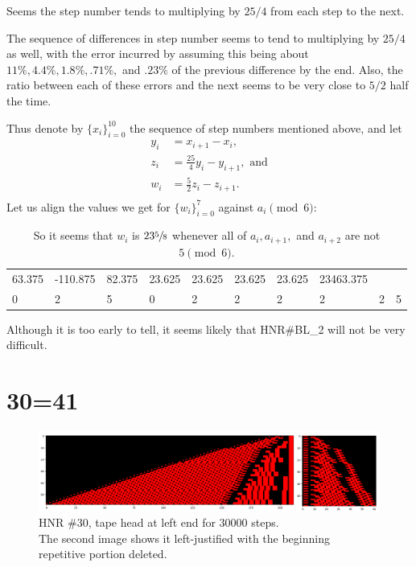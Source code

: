 \documentclass[12pt]{article}
\begin{document}
Seems the step number tends to multiplying by $25/4$ from each step to the next.

The sequence of differences in step number seems to tend to multiplying by $25/4$ as well,
with the error incurred by assuming this being about
$11\%, 4.4\%, 1.8\%, .71\%,$ and $.23\%$ of the previous difference by the end.
Also, the ratio between each of these errors and the next seems to be very close to $5/2$ half the time.

Thus denote by $\{x_i\}_{i=0}^{10}$ the sequence of step numbers mentioned above, and let
\begin{align*}
y_i&=x_{i+1}-x_{i},\\
z_i&=\frac{25}{4}y_i-y_{i+1},\textrm{ and}\\
w_i&=\frac{5}{2}z_i-z_{i+1}.\\
\end{align*}
Let us align the values we get for $\{w_i\}_{i=0}^{7}$ against $a_i\pmod6$:
\begin{table}[H]
\begin{tabular}{llllllllll}
63.375&-110.875&82.375&23.625&23.625&23.625&23.625&23463.375&{}&{}\\
0&2&5&0&2&2&2&2&2&5
\end{tabular}
\caption*{So it seems that $w_i$ is $23\sfrac{5}{8}$ whenever all of $a_i,a_{i+1},$ and $a_{i+2}$ are not $5\pmod6.$}
\end{table}
Although it is too early to tell, it seems likely that HNR\#BL\_2 will not be very difficult.

\clearpage
{}
{}
\section*{30=41}
\begin{figure}[H]
\centering
\includegraphics[width=\textwidth]{30.png}
\caption{HNR \#30, tape head at left end for 30000 steps.\\
The second image shows it left-justified with the beginning repetitive portion deleted.}
\end{figure}
\end{document}

